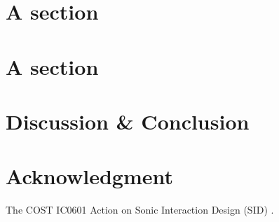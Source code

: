 \documentclass{article}
\begin{document}
%

\section{A section}  
 



%

\section{A section}   


%

\section{Discussion \& Conclusion}



%

\section{Acknowledgment}

 The COST IC0601 Action on Sonic Interaction Design (SID) .


\small

\end{document}

